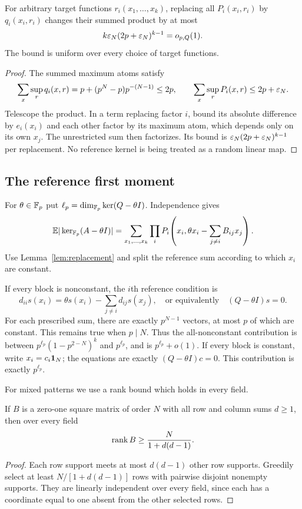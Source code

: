\begin{lemma}\label{lem:replacement}
For arbitrary target functions $r_i(x_1,\ldots,x_k)$, replacing all
$P_i(x_i,r_i)$ by $q_i(x_i,r_i)$ changes their summed product by at most
\begin{equation}\label{eq:replacement}
 k\varepsilon_N(2p+\varepsilon_N)^{k-1}=o_{p,Q}(1).
\end{equation}
The bound is uniform over every choice of target functions.
\end{lemma}
\begin{proof}
The summed maximum atoms satisfy
\[
 \sum_x\sup_r q_i(x,r)
 =p+(p^N-p)p^{-(N-1)}\le2p,
 \qquad
 \sum_x\sup_r P_i(x,r)\le2p+\varepsilon_N.
\]
Telescope the product. In a term replacing factor $i$, bound its
absolute difference by $e_i(x_i)$ and each other factor by its
maximum atom, which depends only on its own $x_j$. The unrestricted
sum then factorizes. Its bound is
$\varepsilon_N(2p+\varepsilon_N)^{k-1}$ per replacement.
No reference kernel is being treated as a random linear map.
\end{proof}

\subsection{The reference first moment}
For $\theta\in\mathbb F_p$ put
$\ell_p=\dim_{\mathbb F_p}\ker(Q-\theta I)$. Independence gives
\[
 \mathbb E|\ker_{\mathbb F_p}(A-\theta I)|
 =\sum_{x_1,\ldots,x_k}
    \prod_iP_i\!\left(x_i,\theta x_i-\sum_{j\ne i}B_{ij}x_j\right).
\]
Use Lemma~\ref{lem:replacement} and split the reference sum according
to which $x_i$ are constant.

If every block is nonconstant, the $i$th reference condition is
\[
 d_{ii}s(x_i)=\theta s(x_i)-\sum_{j\ne i}d_{ij}s(x_j),
 \quad\text{or equivalently}\quad (Q-\theta I)s=0.
\]
For each prescribed sum, there are exactly $p^{N-1}$ vectors, at
most $p$ of which are constant. This remains true when $p\mid N$.
Thus the all-nonconstant contribution is between
$p^{\ell_p}(1-p^{2-N})^k$ and $p^{\ell_p}$, and is
$p^{\ell_p}+o(1)$. If every block is constant, write
$x_i=c_i\mathbf 1_N$; the equations are exactly $(Q-\theta I)c=0$.
This contribution is exactly $p^{\ell_p}$.

For mixed patterns we use a rank bound which holds in every field.
\begin{lemma}\label{lem:cross-rank}
If $B$ is a zero-one square matrix of order $N$ with all row and
column sums $d\ge1$, then over every field
\begin{equation}\label{eq:cross-rank}
 \operatorname{rank} B\ge\frac{N}{1+d(d-1)}.
\end{equation}
\end{lemma}
\begin{proof}
Each row support meets at most $d(d-1)$ other row supports. Greedily
select at least $N/[1+d(d-1)]$ rows with pairwise disjoint nonempty
supports. They are linearly independent over every field, since each
has a coordinate equal to one absent from the other selected rows.
\end{proof}

